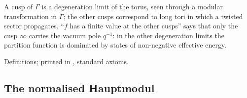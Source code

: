 \begin{physics}
A cusp of $\Gamma$ is a degeneration limit of the torus, seen through a modular transformation in $\Gamma$; the other
cusps correspond to long tori in which a twisted sector propagates.  ``$f$ has a finite value at the other cusps''
says that only the cusp $\infty$ carries the vacuum pole $q^{-1}$: in the other degeneration limits the partition
function is dominated by states of non-negative effective energy.
\end{physics}
\begin{status}
Definitions; printed in , standard axioms.
\end{status}

\subsection{The normalised Hauptmodul}

